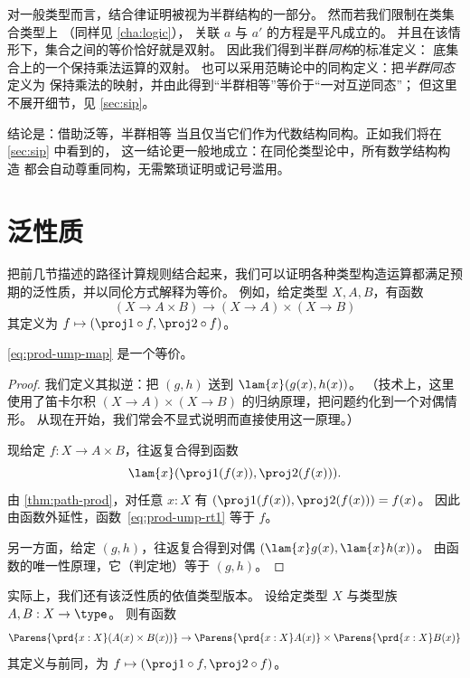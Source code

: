 对一般类型而言，结合律证明被视为半群结构的一部分。
然而若我们限制在类集合类型上
（同样见 \cref{cha:logic}），
关联 $a$ 与 $a'$ 的方程是平凡成立的。
并且在该情形下，集合之间的等价恰好就是双射。
因此我们得到半群\emph{同构}的标准定义： 
底集合上的一个保持乘法运算的双射。
也可以采用范畴论中的同构定义：把\emph{半群同态}定义为
保持乘法的映射，并由此得到“半群相等”等价于“一对互逆同态”；
但这里不展开细节，见 \cref{sec:sip}。

结论是：借助泛等，半群相等
当且仅当它们作为代数结构同构。正如我们将在 \cref{sec:sip} 中看到的，
这一结论更一般地成立：在同伦类型论中，所有数学结构构造
都会自动尊重同构，无需繁琐证明或记号滥用。
\section{泛性质}
\label{sec:universal-properties}

%
把前几节描述的路径计算规则结合起来，我们可以证明各种类型构造运算都满足预期的泛性质，并以同伦方式解释为等价。
例如，给定类型 $X,A,B$，有函数
%
\begin{equation}\label{eq:prod-ump-map}
  (X\to A\times B) \to (X\to A)\times (X\to B)
\end{equation}
其定义为 $f \mapsto (\proj1 \circ f, \proj2\circ f)$。

\begin{thm}\label{thm:prod-ump}
  \eqref{eq:prod-ump-map} 是一个等价。
\end{thm}
\begin{proof}
  我们定义其拟逆：把 $(g,h)$ 送到 $\lam{x}(g(x),h(x))$。
  （技术上，这里使用了笛卡尔积 $(X\to A)\times (X\to B)$ 的归纳原理，把问题约化到一个对偶情形。
  从现在开始，我们常会不显式说明而直接使用这一原理。）

  现给定 $f:X\to A\times B$，往返复合得到函数
  \begin{equation}
    \lam{x} (\proj1(f(x)),\proj2(f(x))).\label{eq:prod-ump-rt1}
  \end{equation}
  由 \cref{thm:path-prod}，对任意 $x:X$ 有 $(\proj1(f(x)),\proj2(f(x))) = f(x)$。
  因此由函数外延性，函数~\eqref{eq:prod-ump-rt1} 等于 $f$。

  另一方面，给定 $(g,h)$，往返复合得到对偶 $(\lam{x} g(x),\lam{x} h(x))$。
  由函数的唯一性原理，它（判定地）等于 $(g,h)$。
\end{proof}

实际上，我们还有该泛性质的依值类型版本。
设给定类型 $X$ 与类型族 $A,B:X\to \type$。
则有函数
\begin{equation}\label{eq:prod-umpd-map}
  \Parens{\prd{x:X} (A(x)\times B(x))} \to \Parens{\prd{x:X} A(x)} \times \Parens{\prd{x:X} B(x)}
\end{equation}
其定义与前同，为 $f \mapsto (\proj1 \circ f, \proj2\circ f)$。


